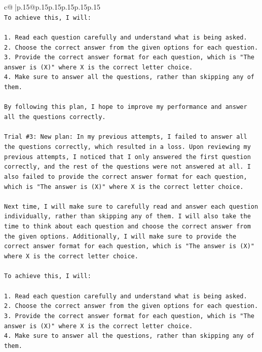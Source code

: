 \documentclass{article}
\begin{document}
{\begin{supertabular}{c@{$\;$}|p{.15\linewidth}@{}p{.15\linewidth}p{.15\linewidth}p{.15\linewidth}p{.15\linewidth}p{.15\linewidth}}
{{{\\ 
\texttt{To achieve this, I will:} \\
\\ 
\texttt{1. Read each question carefully and understand what is being asked.} \\
\texttt{2. Choose the correct answer from the given options for each question.} \\
\texttt{3. Provide the correct answer format for each question, which is "The answer is (X)" where X is the correct letter choice.} \\
\texttt{4. Make sure to answer all the questions, rather than skipping any of them.} \\
\\ 
\texttt{By following this plan, I hope to improve my performance and answer all the questions correctly.} \\
\\ 
\texttt{Trial \#3: New plan: In my previous attempts, I failed to answer all the questions correctly, which resulted in a loss. Upon reviewing my previous attempts, I noticed that I only answered the first question correctly, and the rest of the questions were not answered at all. I also failed to provide the correct answer format for each question, which is "The answer is (X)" where X is the correct letter choice.} \\
\\ 
\texttt{Next time, I will make sure to carefully read and answer each question individually, rather than skipping any of them. I will also take the time to think about each question and choose the correct answer from the given options. Additionally, I will make sure to provide the correct answer format for each question, which is "The answer is (X)" where X is the correct letter choice.} \\
\\ 
\texttt{To achieve this, I will:} \\
\\ 
\texttt{1. Read each question carefully and understand what is being asked.} \\
\texttt{2. Choose the correct answer from the given options for each question.} \\
\texttt{3. Provide the correct answer format for each question, which is "The answer is (X)" where X is the correct letter choice.} \\
\texttt{4. Make sure to answer all the questions, rather than skipping any of them.} \\
}}}
\end{supertabular}}
\end{document}
